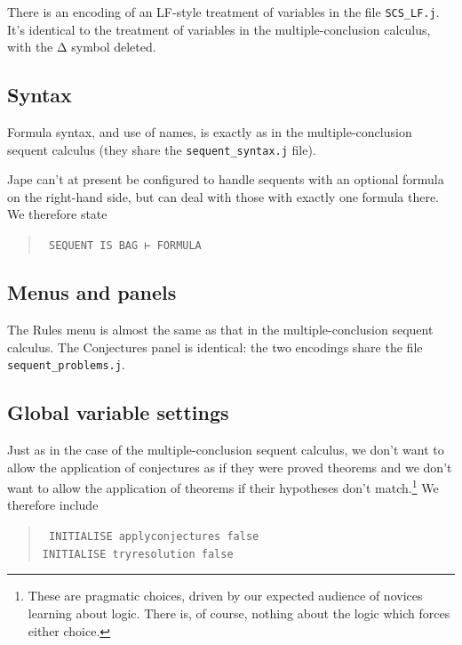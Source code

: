 There is an encoding of an LF-style treatment of variables in the file \texttt{SCS\_LF.j}. It's identical to the treatment of variables in the multiple-conclusion calculus, with the Δ symbol deleted.

\subsection{Syntax}

Formula syntax, and use of names, is exactly as in the multiple-conclusion sequent calculus (they share the \texttt{sequent\_syntax.j} file).

Jape can't at present be configured to handle sequents with an optional formula on the right-hand side, but can deal with those with exactly one formula there. We therefore state
\begin{quote}\tt\small
SEQUENT IS BAG ⊢ FORMULA
\end{quote}

\subsection{Menus and panels}

The Rules menu is almost the same as that in the multiple-conclusion sequent calculus. The Conjectures panel is identical: the two encodings share the file \texttt{sequent\_problems.j}.

\subsection{Global variable settings}

Just as in the case of the multiple-conclusion sequent calculus, we don't want to allow the application of conjectures as if they were proved theorems and we don't want to allow the application of theorems if their hypotheses don't match.\footnote{These are pragmatic choices, driven by our expected audience of novices learning about logic. There is, of course, nothing about the logic which forces either choice.} We therefore include
\begin{quote}\tt\small
INITIALISE applyconjectures false\\
INITIALISE tryresolution false
\end{quote}


